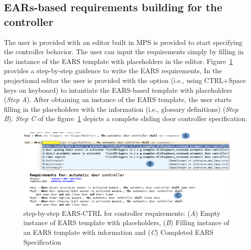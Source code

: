 \subsection{EARs-based requirements building for the controller}
\vspace{-.5cm}
The user is provided with an editor built in MPS
is provided to start specifying the controller behavior. The user can input the
requirements simply by filling in the instance of the EARS template with
placeholders in the editor. Figure~\ref{fig:EARS_req} provides a step-by-step
guidence to write the EARS requirements, In the projectional editor the user is
provided with the option (i.e., using CTRL+Space keys on keyboard) to intantiate
the EARS-based template with placeholders (\emph{Step A}). After obtaining an
instance of the EARS template, the user starts filling in the placeholders with the information
(i.e., glossary definitions) (\emph{Step B}). \emph{Step C} of the
figure~\ref{fig:EARS_req} depicts a complete sliding door controller specification.
\begin{figure}[!h]
\centering
\includegraphics[width=1\textwidth]{./images/EARSREQSPEC.png}
\caption{step-by-step EARS-CTRL for controller requirements: (\emph{A}) Empty
instance of EARS template with placeholders, (\emph{B}) Filling instance of an EARS
template with information and (\emph{C}) Completed EARS Specification }
\label{fig:EARS_req}
\end{figure}
